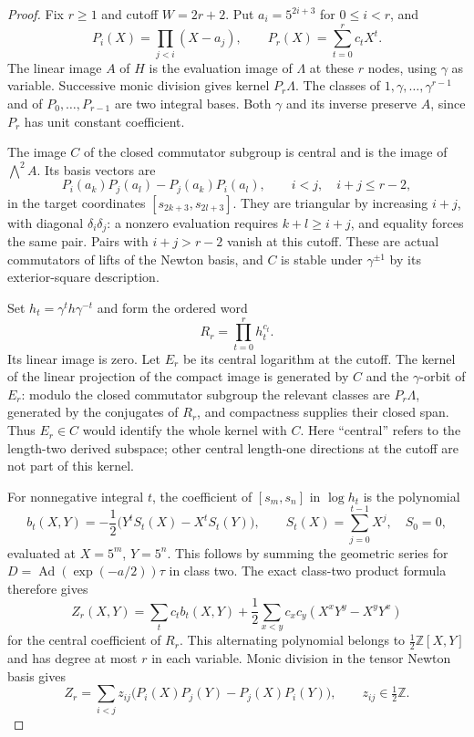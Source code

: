 \documentclass[11pt,a4paper]{article}
\theoremstyle{definition}
\begin{document}
\begin{proof}
Fix $r\geq1$ and cutoff $W=2r+2$. Put $a_i=5^{2i+3}$ for
$0\leq i<r$, and
\[
 P_i(X)=\prod_{j<i}(X-a_j),\qquad
 P_r(X)=\sum_{t=0}^r c_tX^t.
\]
The linear image $A$ of $H$ is the evaluation image of
$\Lambda$ at these $r$ nodes, using $\gamma$ as variable.
Successive monic division gives kernel $P_r\Lambda$.
The classes of $1,\gamma,\ldots,\gamma^{r-1}$ and of
$P_0,\ldots,P_{r-1}$ are two integral bases. Both $\gamma$
and its inverse preserve $A$, since $P_r$ has unit constant
coefficient.

The image $C$ of the closed commutator subgroup is central
and is the image of $\bigwedge^2 A$. Its basis vectors are
\[
 P_i(a_k)P_j(a_l)-P_j(a_k)P_i(a_l),\qquad
       i<j,\quad i+j\leq r-2,
\]
in the target coordinates $[s_{2k+3},s_{2l+3}]$.
They are triangular by increasing $i+j$, with diagonal
$\delta_i\delta_j$: a nonzero evaluation requires
$k+l\geq i+j$, and equality forces the same pair.
Pairs with $i+j>r-2$ vanish at this cutoff. These are actual
commutators of lifts of the Newton basis, and $C$ is stable
under $\gamma^{\pm1}$ by its exterior-square description.

Set $h_t=\gamma^t h\gamma^{-t}$ and form the ordered word
\[
 R_r=\prod_{t=0}^r h_t^{c_t}.
\]
Its linear image is zero. Let $E_r$ be its central logarithm
at the cutoff. The kernel of the linear projection of the
compact image is generated by $C$ and the $\gamma$-orbit of
$E_r$: modulo the closed commutator subgroup the relevant
classes are $P_r\Lambda$, generated by the conjugates of
$R_r$, and compactness supplies their closed span. Thus
$E_r\in C$ would identify the whole kernel with $C$.
Here ``central'' refers to the length-two derived subspace;
other central length-one directions at the cutoff are not
part of this kernel.

For nonnegative integral $t$, the coefficient of
$[s_m,s_n]$ in $\log h_t$ is the polynomial
\[
 b_t(X,Y)=-\frac12\bigl(Y^t S_t(X)-X^tS_t(Y)\bigr),
 \qquad S_t(X)=\sum_{j=0}^{t-1}X^j,\quad S_0=0,
\]
evaluated at $X=5^m$, $Y=5^n$. This follows by summing the
geometric series for
$D=\operatorname{Ad}(\exp(-a/2))\tau$ in class two.
The exact class-two product formula therefore gives
\[
 Z_r(X,Y)=\sum_t c_tb_t(X,Y)
 +\frac12\sum_{x<y}c_xc_y(X^xY^y-X^yY^x)               \tag{C2.1}
\]
for the central coefficient of $R_r$. This alternating
polynomial belongs to $\tfrac12\mathbb Z[X,Y]$ and has degree
at most $r$ in each variable. Monic division in the tensor
Newton basis gives
\[
 Z_r=\sum_{i<j}z_{ij}
       \bigl(P_i(X)P_j(Y)-P_j(X)P_i(Y)\bigr),
       \qquad z_{ij}\in\tfrac12\mathbb Z.             \tag{C2.2}
\]


\end{proof}
\end{document}
